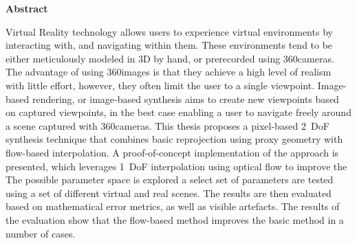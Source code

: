 \vspace*{2cm}

\begin{center}
    \textbf{Abstract}
\end{center}

\vspace*{1cm}

\noindent 
Virtual Reality technology allows users to experience virtual environments by interacting with, and navigating within them. These environments tend to be either meticulously modeled in 3D by hand, or prerecorded using 360\degree cameras. The advantage of using 360\degree images is that they achieve a high level of realism with little effort, however, they often limit the user to a single viewpoint.
Image-based rendering, or image-based synthesis aims to create new viewpoints based on captured viewpoints, in the best case enabling a user to navigate freely around a scene captured with 360\degree cameras.
This thesis proposes a pixel-based 2~DoF synthesis technique that combines basic reprojection using proxy geometry with flow-based interpolation.
A proof-of-concept implementation of the approach is presented, which leverages 1~DoF interpolation using optical flow to improve the 
The possible parameter space is explored a select set of parameters are
tested using a set of different virtual and real scenes.
The results are then evaluated based on mathematical error metrics, as well as visible artefacts. The results of the evaluation show that the flow-based method improves the basic method in a number of cases.

